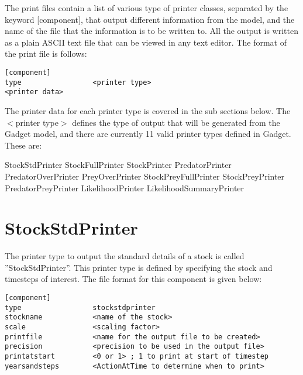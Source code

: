\documentclass[10pt,twoside]{book}
\begin{document}
The print files contain a list of various type of printer classes, separated by the keyword [component], that output different information from the model, and the name of the file that the information is to be written to.  All the output is written as a plain ASCII text file that can be viewed in any text editor.  The format of the print file is follows:

{\small\begin{verbatim}
[component]
type                 <printer type>
<printer data>
\end{verbatim}}

The printer data for each printer type is covered in the sub sections below.  The $<$printer type$>$ defines the type of output that will be generated from the Gadget model, and there are currently 11 valid printer types defined in Gadget.  These are:

\bigskip
StockStdPrinter\newline
StockFullPrinter\newline
StockPrinter\newline
PredatorPrinter\newline
PredatorOverPrinter\newline
PreyOverPrinter\newline
StockPreyFullPrinter\newline
StockPreyPrinter\newline
PredatorPreyPrinter\newline
LikelihoodPrinter\newline
LikelihoodSummaryPrinter

\newpage %
\section{StockStdPrinter}\label{sec:stockstdprinter}
The printer type to output the standard details of a stock is called ''StockStdPrinter''.  This printer type is defined by specifying the stock and timesteps of interest.  The file format for this component is given below:

{\small\begin{verbatim}
[component]
type                 stockstdprinter
stockname            <name of the stock>
scale                <scaling factor>
printfile            <name for the output file to be created>
precision            <precision to be used in the output file>
printatstart         <0 or 1> ; 1 to print at start of timestep
yearsandsteps        <ActionAtTime to determine when to print>
\end{verbatim}}
\end{document}
